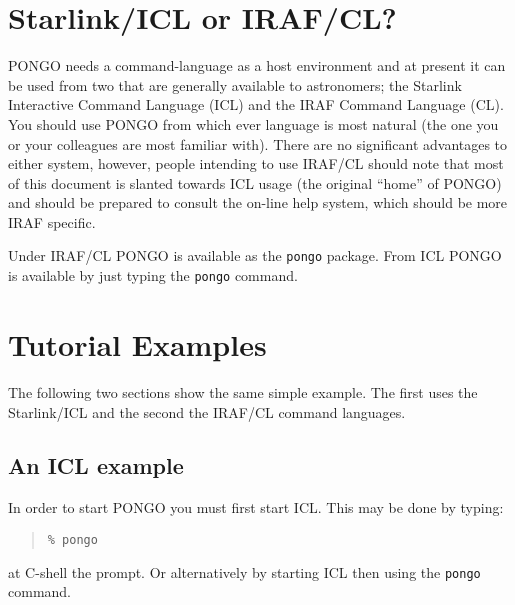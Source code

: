 \section{Starlink/ICL or IRAF/CL?}
PONGO needs a command-language as a host environment and at present it
can be used from two that are generally available to astronomers; the
Starlink Interactive Command Language (ICL) and the IRAF Command
Language (CL).  You should use PONGO from which ever language is most
natural (\ie the one you or your colleagues are most familiar
with). There are no significant advantages to either system, however,
people intending to use IRAF/CL should note that most of this document
is slanted towards ICL usage (the original ``home'' of PONGO) and
should be prepared to consult the on-line help system, which should be
more IRAF specific.

Under IRAF/CL PONGO is available as the \verb+pongo+ package. From ICL
PONGO is available by just typing the \verb+pongo+ command.

\section{Tutorial Examples}
The following two sections show the same simple example. The first
uses the Starlink/ICL and the second the IRAF/CL command
languages.

\subsection{An ICL example}

In order to start PONGO you must first start ICL. This may be done by typing:
\begin{quote}
\begin{verbatim}
% pongo
\end{verbatim}
\end{quote}
at C-shell the prompt. Or alternatively by starting ICL then using the
\verb+pongo+ command.

